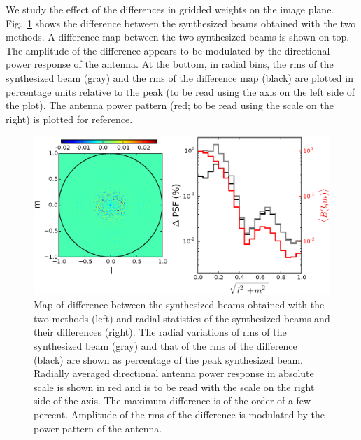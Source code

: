 \documentclass[a4paper,fleqn,usenatbib]{mnras}
\begin{document}
We study the effect of the differences in gridded weights on the image plane. 
Fig.~\ref{fig:psf-diff} shows the difference between the synthesized beams 
obtained with the two methods. A difference map between the two synthesized 
beams is shown on top. The amplitude of the difference appears to be 
modulated by the directional power response of the antenna. At the bottom, 
in radial bins, the rms of the synthesized beam (gray) and the rms of the 
difference map (black) are plotted in percentage units relative to the peak 
(to be read using the axis on the left side of the plot). The antenna power 
pattern (red; to be read using the scale on the right) is plotted for reference. 

\begin{figure}
  \includegraphics[width=\columnwidth]{figure8}
  \caption{Map of difference between the synthesized beams obtained with the 
    two methods (left) and radial statistics of the synthesized beams and 
    their differences (right). The radial variations of rms of the synthesized 
    beam (gray) and that of the rms of the difference (black) are shown as 
    percentage of the peak synthesized beam. Radially averaged directional 
    antenna power response in absolute scale is shown in red and is to be read 
    with the scale on the right side of the axis. The maximum difference is of 
    the order of a few percent. Amplitude of the rms of the difference is 
    modulated by the power pattern of the antenna.}
  \label{fig:psf-diff}
\end{figure}
\end{document}
